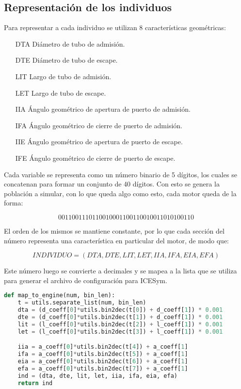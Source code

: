 \subsection{Representación de los individuos}

Para representar a cada individuo se utilizan 8 características geométricas:

\begin{enumerate}
    \item [DTA] Diámetro de tubo de admisión.
    \item [DTE] Diámetro de tubo de escape.
    \item [LIT] Largo de tubo de admisión.
    \item [LET] Largo de tubo de escape.
    \item [IIA] Ángulo geométrico de apertura de puerto de admisión.
    \item [IFA] Ángulo geométrico de cierre de puerto de admisión.
    \item [IIE] Ángulo geométrico de apertura de puerto de escape.
    \item [IFE] Ángulo geométrico de cierre de puerto de escape.
\end{enumerate}

Cada variable se representa como un número binario de 5 dígitos, los cuales se
concatenan para formar un conjunto de 40 dígitos.
%
Con esto se genera la población a simular, con lo que queda algo como esto, cada
motor queda de la forma:

\begin{equation}
  0011001110110010001100110010011010100110 \nonumber
\end{equation}

El orden de los mismos se mantiene constante, por lo que cada sección del número
representa una característica en particular del motor, de modo que:

\begin{equation}
    INDIVIDUO = (DTA, DTE, LIT, LET, IIA, IFA, EIA, EFA) \nonumber
\end{equation}

Este número luego se convierte a decimales y se mapea a la lista que se utiliza
para generar el archivo de configuración para ICESym.
%

\begin{lstlisting}[language=Python]
def map_to_engine(num, bin_len):
    t = utils.separate_list(num, bin_len)
    dta = (d_coeff[0]*utils.bin2dec(t[0]) + d_coeff[1]) * 0.001
    dte = (d_coeff[0]*utils.bin2dec(t[1]) + d_coeff[1]) * 0.001
    lit = (l_coeff[0]*utils.bin2dec(t[2]) + l_coeff[1]) * 0.001
    let = (l_coeff[0]*utils.bin2dec(t[3]) + l_coeff[1]) * 0.001

    iia = a_coeff[0]*utils.bin2dec(t[4]) + a_coeff[1]
    ifa = a_coeff[0]*utils.bin2dec(t[5]) + a_coeff[1]
    eia = a_coeff[0]*utils.bin2dec(t[6]) + a_coeff[1]
    efa = a_coeff[0]*utils.bin2dec(t[7]) + a_coeff[1]
    ind = (dta, dte, lit, let, iia, ifa, eia, efa)
    return ind
\end{lstlisting}

